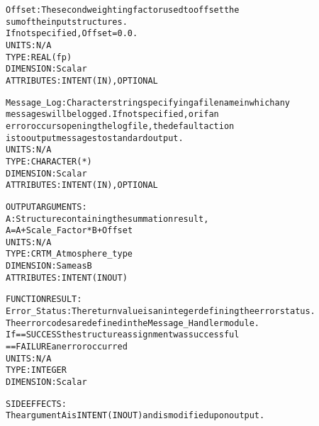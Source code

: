 \begin{alltt}
        Offset:          The second weighting factor used to offset the
                         sum of the input structures.
                         If not specified, Offset = 0.0.
                         UNITS:      N/A
                         TYPE:       REAL(fp)
                         DIMENSION:  Scalar
                         ATTRIBUTES: INTENT(IN), OPTIONAL
 
        Message_Log:     Character string specifying a filename in which any
                         messages will be logged. If not specified, or if an
                         error occurs opening the log file, the default action
                         is to output messages to standard output.
                         UNITS:      N/A
                         TYPE:       CHARACTER(*)
                         DIMENSION:  Scalar
                         ATTRIBUTES: INTENT(IN), OPTIONAL
 
  OUTPUT ARGUMENTS:
        A:               Structure containing the summation result,
                         A = A + Scale_Factor*B + Offset
                         UNITS:      N/A
                         TYPE:       CRTM_Atmosphere_type
                         DIMENSION:  Same as B
                         ATTRIBUTES: INTENT(IN OUT)
 
  FUNCTION RESULT:
        Error_Status:    The return value is an integer defining the error status.
                         The error codes are defined in the Message_Handler module.
                         If == SUCCESS the structure assignment was successful
                            == FAILURE an error occurred
                         UNITS:      N/A
                         TYPE:       INTEGER
                         DIMENSION:  Scalar
 
  SIDE EFFECTS:
        The argument A is INTENT(IN OUT) and is modified upon output.
 
  \end{alltt}
